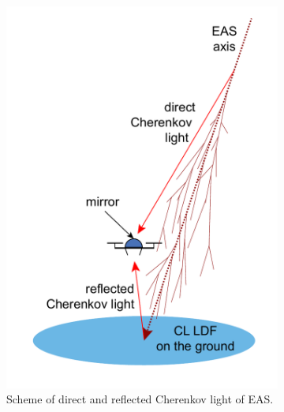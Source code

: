 \documentclass[a4paper]{jpconf}
\begin{document}
\begin{figure}[t]
\centering %
\begin{subfigure}[b]{0.45\textwidth}
    \includegraphics[height=.40\textheight]{DirectCL.pdf}
    \caption{Scheme of direct and reflected Cherenkov light of EAS.}
    \label{fig:DirectCL}
\end{subfigure}
\hfill
\begin{subfigure}[b]{0.53\textwidth}

\end{subfigure}
\end{figure}
\end{document}
